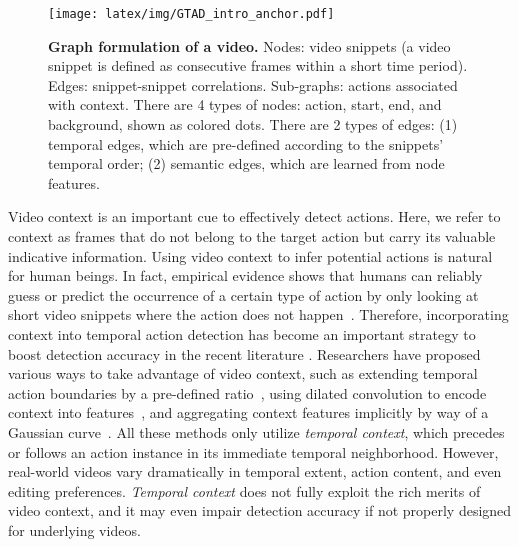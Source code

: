 \documentclass[10pt,twocolumn,letterpaper]{article}
\begin{document}
\begin{figure}[t]
    \centering
    \texttt{[image: latex/img/GTAD\_intro\_anchor.pdf]}
\caption{\textbf{Graph formulation of a video.} Nodes: video snippets (a video snippet is defined as consecutive frames within a short time period). Edges:  snippet-snippet correlations. Sub-graphs: actions associated with context. There are 4 types of nodes: action, start, end, and background, shown as colored dots. There are 2 types of edges: (1) temporal edges, which are pre-defined according to the snippets' temporal order; (2) semantic edges, which are learned from node features.} 
    \label{fig:intro}
\end{figure}




Video context is an important cue to effectively detect actions. Here, we refer to context as  
frames that do not belong to the target action but carry its valuable indicative information. 
Using video context to infer potential actions is natural for human beings. In fact, empirical evidence shows that humans can reliably guess or predict the occurrence of a certain type of action by only looking at short video snippets where the action does not happen~\cite{detad, Alwassel2017ActionSS}. Therefore, incorporating context into temporal action detection has become an important strategy to boost detection accuracy in the recent literature \cite{ dai2017temporal, gao2017turn, chao2018rethinking, Long2019GaussianTA, TSN2016ECCV, zhao2017temporal, lin2018bsn}. Researchers have proposed various ways to take advantage of video context, such as extending temporal action boundaries by a pre-defined ratio~\cite{dai2017temporal, gao2017turn, TSN2016ECCV, zhao2017temporal, lin2018bsn}, using dilated convolution to encode context into features~\cite{chao2018rethinking}, and aggregating context features implicitly by way of a Gaussian curve~\cite{Long2019GaussianTA}. All these methods only utilize \textit{temporal context}, which precedes or follows an action instance in its immediate temporal neighborhood. However, real-world videos vary dramatically in temporal extent, action content, and even editing preferences. \textit{Temporal context} does not fully exploit the rich merits of video context, and it may even impair detection accuracy if not properly designed for underlying videos. 
\end{document}
